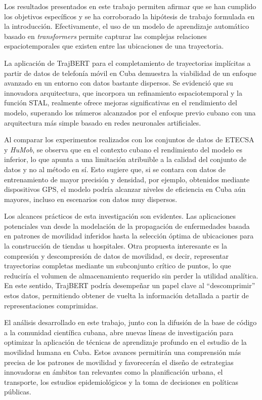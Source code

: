 \begin{conclusions}

    Los resultados presentados en este trabajo permiten afirmar que se han cumplido los objetivos específicos y se ha corroborado la hipótesis de trabajo formulada en la introducción. Efectivamente, el uso de un modelo de aprendizaje automático basado en \textit{transformers} permite capturar las complejas relaciones espaciotemporales que existen entre las ubicaciones de una trayectoria.
    
    La aplicación de TrajBERT para el completamiento de trayectorias implícitas a partir de datos de telefonía móvil en Cuba demuestra la viabilidad de un enfoque avanzado en un entorno con datos bastante dispersos. Se evidenció que su innovadora arquitectura, que incorpora un refinamiento espaciotemporal y la función STAL, realmente ofrece mejoras significativas en el rendimiento del modelo, superando los números alcanzados por el enfoque previo cubano con una arquitectura más simple basado en redes neuronales artificiales.
    
    Al comparar los experimentos realizados con los conjuntos de datos de ETECSA y \textit{HuMob}, se observa que en el contexto cubano el rendimiento del modelo es inferior, lo que apunta a una limitación atribuible a la calidad del conjunto de datos y no al método en sí. Esto sugiere que, si se contara con datos de entrenamiento de mayor precisión y densidad, por ejemplo, obtenidos mediante dispositivos GPS, el modelo podría alcanzar niveles de eficiencia en Cuba aún mayores, incluso en escenarios con datos muy dispersos.
    
    Los alcances prácticos de esta investigación son evidentes. Las aplicaciones potenciales van desde la modelación de la propagación de enfermedades basada en patrones de movilidad inferidos hasta la selección óptima de ubicaciones para la construcción de tiendas u hospitales. Otra propuesta interesante es la compresión y descompresión de datos de movilidad, es decir, representar trayectorias completas mediante un subconjunto crítico de puntos, lo que reduciría el volumen de almacenamiento requerido sin perder la utilidad analítica. En este sentido, TrajBERT podría desempeñar un papel clave al ``descomprimir'' estos datos, permitiendo obtener de vuelta la información detallada a partir de representaciones comprimidas.
    
    El análisis desarrollado en este trabajo, junto con la difusión de la base de código a la comunidad científica cubana, abre nuevas líneas de investigación para optimizar la aplicación de técnicas de aprendizaje profundo en el estudio de la movilidad humana en Cuba. Estos avances permitirán una comprensión más precisa de los patrones de movilidad y favorecerán el diseño de estrategias innovadoras en ámbitos tan relevantes como la planificación urbana, el transporte, los estudios epidemiológicos y la toma de decisiones en políticas públicas.
        
\end{conclusions}